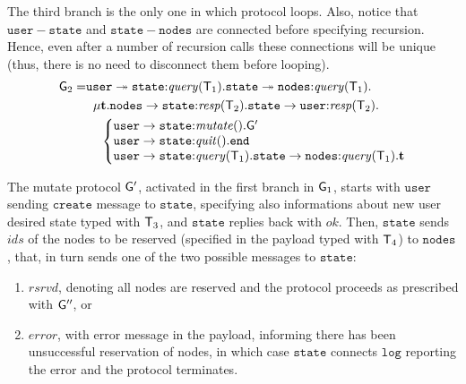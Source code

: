 The third branch is the only one in which protocol loops. Also, notice that $\mathtt{user}-\mathtt{state}$ and $\mathtt{state}-\mathtt{nodes}$ are connected before specifying recursion. Hence, even after a number of recursion calls these connections will be unique (thus, there is no need to disconnect them before looping).   
\begin{align*}
\G_2 = & 
\mathtt{user} \twoheadrightarrow \mathtt{state}{:}\mathit{query}(\T_1).
\mathtt{state}\twoheadrightarrow \mathtt{nodes}{:}\mathit{query}(\T_1). \\
& \hspace{2mm}
\mu \ty.
\mathtt{nodes}\to \mathtt{state}{:}\mathit{resp}(\T_2).
\mathtt{state}\to\mathtt{user}{:}\mathit{resp}(\T_2). \\
& \hspace{4mm}
\left\{
\begin{array}{@{}l@{}}
\mathtt{user}\to\mathtt{state}{:} \mathit{mutate}().\G'\\
\mathtt{user}\to\mathtt{state}{:} \mathit{quit}().\tend\\
\mathtt{user}\to\mathtt{state}{:} \mathit{query}(\T_1).\mathtt{state}\to\mathtt{nodes}{:}\mathit{query}(\T_1).\ty
\end{array} \right.
\end{align*}

The mutate protocol ${\sf G}'$, activated in the first branch in ${\sf G}_1$, starts with $\mathtt{user}$ sending 
$\mathtt{create}$ message to $\mathtt{state}$, specifying also informations about new user desired state typed with ${\mathsf T}_3$, 
and $\mathtt{state}$ replies back with $\mathit{ok}$. 
Then, $\mathtt{state}$ sends $\mathit{ids}$ of the nodes to be reserved (specified in the payload typed with ${\mathsf T}_4$) to $\mathtt{nodes}$, that, in turn sends one of the two possible messages to $\mathtt{state}$: 

\begin{enumerate}[start=1,label={(\bfseries \roman*)}]
	\item $\mathit{rsrvd}$, denoting all nodes are reserved and the protocol proceeds as prescribed with ${\sf G}''$, or
	\item $\mathit{error}$, with error message in the payload, informing there has been unsuccessful reservation of nodes, in which case $\mathtt{state}$ connects $\mathtt{log}$ reporting the error and the protocol terminates.
\end{enumerate}

